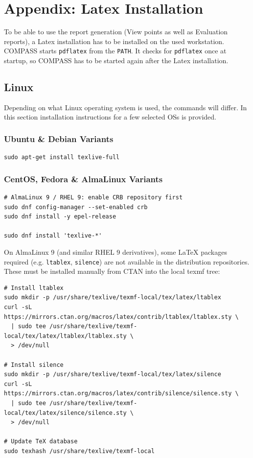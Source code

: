 \section{Appendix: Latex Installation}
\label{sec:appendix_latex}  

To be able to use the report generation (View points as well as Evaluation reports), a Latex installation has to be installed on the used workstation. \\

COMPASS starts \texttt{pdflatex} from the \texttt{PATH}. It checks for \texttt{pdflatex} once at startup, so COMPASS has to be started again after the Latex installation. \\

\subsection{Linux}
\label{sec:appendix_latex_linux}

Depending on what Linux operating system is used, the commands will differ. In this section installation instructions for a few selected OSs is provided.

\subsubsection {Ubuntu \& Debian Variants}

\begin{lstlisting}
sudo apt-get install texlive-full 
\end{lstlisting}

\subsubsection {CentOS, Fedora \& AlmaLinux Variants}

\begin{lstlisting}
# AlmaLinux 9 / RHEL 9: enable CRB repository first
sudo dnf config-manager --set-enabled crb
sudo dnf install -y epel-release

sudo dnf install 'texlive-*'
\end{lstlisting}

On AlmaLinux 9 (and similar RHEL 9 derivatives), some LaTeX packages required (e.g. \texttt{ltablex}, \texttt{silence}) are not available in the distribution repositories. These must be installed manually from CTAN into the local texmf tree:

\begin{lstlisting}
# Install ltablex
sudo mkdir -p /usr/share/texlive/texmf-local/tex/latex/ltablex
curl -sL https://mirrors.ctan.org/macros/latex/contrib/ltablex/ltablex.sty \
  | sudo tee /usr/share/texlive/texmf-local/tex/latex/ltablex/ltablex.sty \
  > /dev/null

# Install silence
sudo mkdir -p /usr/share/texlive/texmf-local/tex/latex/silence
curl -sL https://mirrors.ctan.org/macros/latex/contrib/silence/silence.sty \
  | sudo tee /usr/share/texlive/texmf-local/tex/latex/silence/silence.sty \
  > /dev/null

# Update TeX database
sudo texhash /usr/share/texlive/texmf-local
\end{lstlisting}

